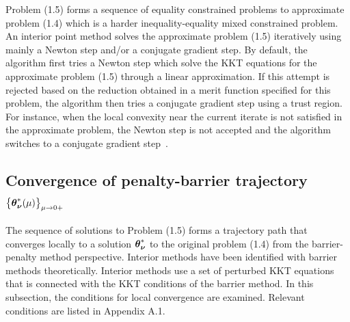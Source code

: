 Problem (1.5) forms a sequence of equality constrained problems to approximate problem (1.4) which is a harder inequality-equality mixed constrained problem. An interior point method solves the approximate problem (1.5) iteratively using mainly a Newton step and/or a conjugate gradient step. By default, the algorithm first tries a Newton step which solve the KKT equations for the approximate problem (1.5) through a linear approximation. If this attempt is rejected based on the reduction obtained in a merit function specified for this problem, the algorithm then tries a conjugate gradient step using a trust region. For instance, when the local convexity near the current iterate is not satisfied in the approximate problem, the Newton step is not accepted and the algorithm switches to a conjugate gradient step~\cite{Byrd1999, Forsgren2002,Waltz2006}. 
\subsection{Convergence of penalty-barrier trajectory $\left\{ \boldsymbol{\theta}_{\boldsymbol{\nu}}^*(\mu)\right\}_{\mu \to 0+}$}
 The sequence of solutions to Problem (1.5) forms a trajectory path that converges locally to a solution $\boldsymbol{\theta}_{\boldsymbol{\nu}}^*$ to the original problem (1.4) from the barrier-penalty method perspective. Interior methods have been identified with barrier methods theoretically. Interior methods use a set of perturbed KKT equations that is connected with the KKT conditions of the barrier method. In this subsection, the conditions for local convergence are examined. Relevant conditions are listed in Appendix A.1. \\

